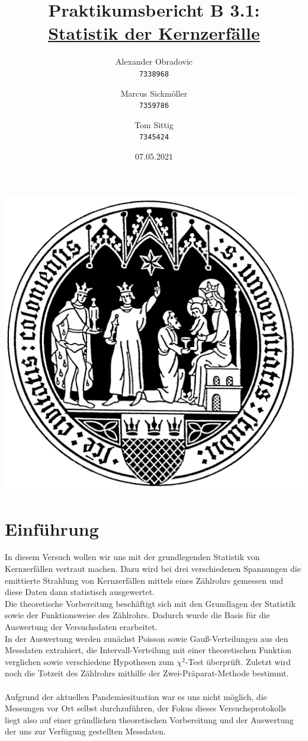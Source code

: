 \documentclass{article}
\title{Praktikumsbericht B 3.1: \\ \underline{Statistik der Kernzerfälle}}
\author{Alexander Obradovic\\
		\texttt{7338968}
		\and
		Marcus Sickmöller\\
		\texttt{7359786}
		\and
		Tom Sittig\\
		\texttt{7345424}}
\date{07.05.2021}
\begin{document}
	\maketitle
	\begin{center}
	\includegraphics[scale=0.13]{siegel.jpg}
	\end{center}
	
	\newpage
	\tableofcontents
	\newpage
	\section{Einführung}
	In diesem Versuch wollen wir uns mit der grundlegenden Statistik von Kernzerfällen vertraut machen. Dazu wird bei drei verschiedenen Spannungen die emittierte Strahlung von Kernzerfällen mittels eines Zählrohrs gemessen und diese Daten dann statistisch ausgewertet. \\
	Die theoretische Vorbereitung beschäftigt sich mit den Grundlagen der Statistik sowie der Funktionsweise des Zählrohrs. Dadurch wurde die Basis für die Auswertung der Versuchsdaten erarbeitet. \\
	In der Auswertung werden zunächst Poisson sowie Gauß-Verteilungen aus den Messdaten extrahiert, die Intervall-Verteilung mit einer theoretischen Funktion verglichen sowie verschiedene Hypothesen zum $\chi^2$-Test überprüft. Zuletzt wird noch die Totzeit des Zählrohrs mithilfe der Zwei-Präparat-Methode bestimmt. \\\\
	Aufgrund der aktuellen Pandemiesituation war es uns nicht möglich, die Messungen vor Ort selbst durchzuführen, der Fokus dieses Versuchsprotokolls liegt also auf einer gründlichen theoretischen Vorbereitung und der Auswertung der uns zur Verfügung gestellten Messdaten.
\end{document}
